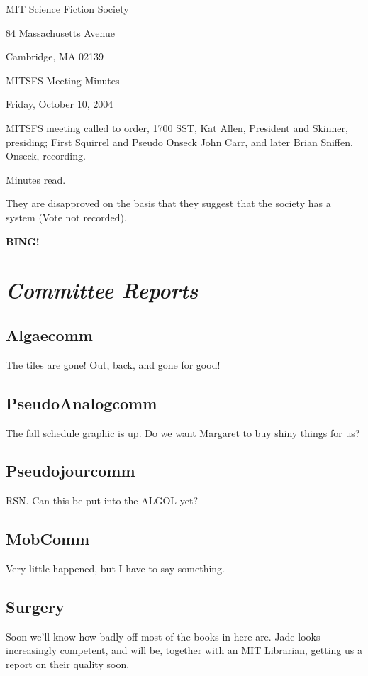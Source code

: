 \documentclass[10pt]{article}
\newcommand{\bing}{{\bf BING!} }
\newcommand{\goto}[1]{\bing \vskip 12pt \section*{{\em{#1}}}}
\begin{document}
\begin{center}

MIT Science Fiction Society

84 Massachusetts Avenue

Cambridge, MA 02139

\vspace{12pt}

MITSFS Meeting Minutes

Friday, October 10, 2004

\end{center}

\vspace{18pt}

\setlength{\parskip}{6pt}

\noindent
MITSFS meeting called to order, 1700 SST, Kat Allen, President and
Skinner, presiding; First Squirrel and Pseudo Onseck John Carr, and
later Brian Sniffen, Onseck, recording.

Minutes read.

They are disapproved on the basis that they suggest that the society
has a system (Vote not recorded).

\goto{Committee Reports}
\subsection*{Algaecomm}
The tiles are gone!  Out, back, and gone for good!

\subsection*{PseudoAnalogcomm}
The fall schedule graphic is up.  Do we want Margaret to buy shiny
things for us?

\subsection*{Pseudojourcomm}
RSN.  Can this be put into the ALGOL yet?

\subsection*{MobComm}
Very little happened, but I have to say something.

\subsection*{Surgery}
Soon we'll know how badly off most of the books in here are.  Jade
looks increasingly competent, and will be, together with an MIT
Librarian, getting us a report on their quality soon.
\end{document}
